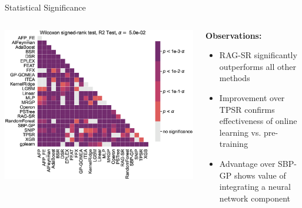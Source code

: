 \documentclass[aspectratio=1610]{beamer}
\begin{document}
    \begin{frame}{Statistical Significance}
        \begin{columns}
            \begin{column}{0.48\textwidth}
                \begin{center}
                    \includegraphics[width=\textwidth]{figs/Pairwise_comparison_of_R2_Test_on_black-box_problems.eps}
                \end{center}
            \end{column}

            \begin{column}{0.48\textwidth}
                \textbf{Observations:}
                \begin{itemize}
                    \item RAG-SR significantly outperforms all other methods
                    \item Improvement over TPSR confirms effectiveness of online learning vs. pre-training
                    \item Advantage over SBP-GP shows value of integrating a neural network component
                \end{itemize}
            \end{column}
        \end{columns}
    \end{frame}
\end{document}

